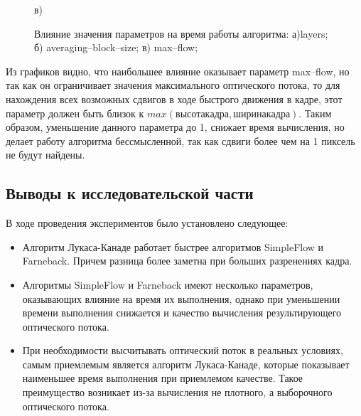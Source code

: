 \begin{figure}[!Htb]
\begin{center}
\begin{minipage}[h]{0.47\linewidth}
	 в) \\
	\end{minipage}
\end{center}
\caption{Влияние значения параметров на время работы алгоритма: а)layers; б)  averaging--block--size; в) max--flow;}
\label{pic:3SF_params}
\end{figure}

Из графиков видно, что наибольшее влияние оказывает параметр max--flow, но так как он ограничивает значения максимального оптического потока, то для нахождения всех возможных сдвигов в ходе быстрого движения в кадре, этот параметр должен быть близок к  $max (высота кадра, ширина кадра) $. Таким образом, уменьшение данного параметра до 1, снижает время вычисления, но делает работу алгоритма бессмысленной, так как сдвиги более чем на 1 пиксель не будут найдены.  


\subsection{Выводы к исследовательской части}
В ходе проведения экспериментов было установлено следующее:
\begin{itemize}
\item Алгоритм Лукаса-Канаде работает быстрее алгоритмов SimpleFlow и Farneback. Причем разница более заметна при больших разренениях кадра. 
\item Алгоритмы SimpleFlow и Farneback имеют несколько параметров, оказывающих влияние на время их выполнения, однако при уменьшении времени выполнения снижается и качество вычисления результирующего оптического потока. 
\item При необходимости высчитывать оптический поток в реальных условиях, самым приемлемым является алгоритм Лукаса-Канаде, которые показывает наименьшее время выполнения при приемлемом качестве. Такое преимущество возникает из-за вычисления не плотного, а выборочного оптического потока. 
\end{itemize}